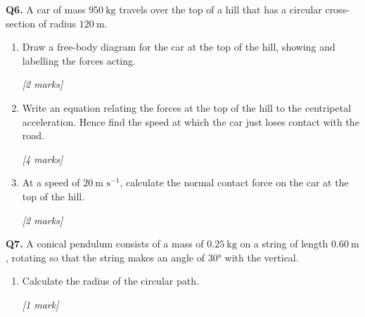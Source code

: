 \begin{tcolorbox}[colback=white, colframe=midblue, breakable]

\begin{minipage}{\linewidth}
\textbf{Q6.} A car of mass $950\ \text{kg}$ travels over the top of a hill that has a circular cross-section of radius $120\ \text{m}$.
\end{minipage}

\begin{enumerate}[label=(\alph*)]
  \item \begin{minipage}[t]{\linewidth}
  Draw a free-body diagram for the car at the top of the hill, showing and labelling the forces acting.
  \par\hfill\textit{[2 marks]}
  \vspace{4.5cm}
  \end{minipage}

  \item \begin{minipage}[t]{\linewidth}
  Write an equation relating the forces at the top of the hill to the centripetal acceleration. Hence find the speed at which the car just loses contact with the road.
  \par\hfill\textit{[4 marks]}
  \vspace{4.5cm}
  \end{minipage}

  \item \begin{minipage}[t]{\linewidth}
  At a speed of $20\ \text{m s}^{-1}$, calculate the normal contact force on the car at the top of the hill.
  \par\hfill\textit{[2 marks]}
  \vspace{3.5cm}
  \end{minipage}
\end{enumerate}

\begin{minipage}{\linewidth}
\textbf{Q7.} A conical pendulum consists of a mass of $0.25\ \text{kg}$ on a string of length $0.60\ \text{m}$, rotating so that the string makes an angle of $30°$ with the vertical.
\end{minipage}

\begin{enumerate}[label=(\alph*)]
  \item \begin{minipage}[t]{\linewidth}
  Calculate the radius of the circular path.
  \par\hfill\textit{[1 mark]}
  \vspace{2.0cm}
  \end{minipage}


\end{enumerate}
\end{tcolorbox}
